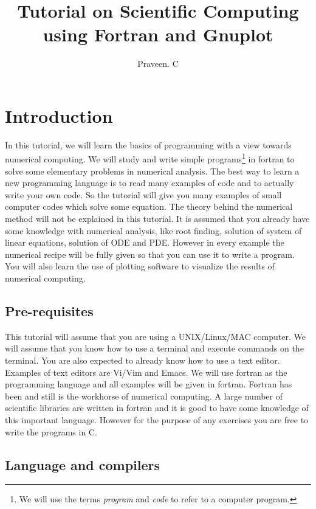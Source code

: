 \documentclass[11pt,oneside]{amsart}
\title{Tutorial on Scientific Computing \\using Fortran and Gnuplot}
\author{Praveen. C}
\date{}                                           %
\begin{document}
\maketitle

\lstset{basicstyle=\ttfamily,language=fortran, frame=single,showstringspaces=false,
numbers=left,numberstyle=\footnotesize}

\section{Introduction}
In this tutorial, we will learn the basics of programming with a view towards numerical computing. We will study and write simple programs\footnote{We will use the terms {\em program} and {\em code} to refer to a computer program.} in fortran to solve some elementary problems in numerical analysis. The best way to learn a new programming language is to read many examples of code and to actually write your own code. So the tutorial will give you many examples of small computer codes which solve some equation. The theory behind the numerical method will not be explained in this tutorial. It is assumed that you already have some knowledge with numerical analysis, like root finding, solution of system of linear equations, solution of ODE and PDE. However in every example the numerical recipe will be fully given so that you can use it to write a program. You will also learn the use of plotting software to visualize the results of  numerical computing. 

\subsection{Pre-requisites}

This tutorial will assume that you are using a UNIX/Linux/MAC computer. We will assume that you know how to use a terminal and execute commands on the terminal. You are also expected to already know how to use a text editor. Examples of text editors are Vi/Vim and Emacs. We will use fortran as the programming language and all examples will be given in fortran. Fortran has been and still is the workhorse of numerical computing. A large number of scientific libraries are written in fortran and it is good to have some knowledge of this important language. However for the purpose of any exercises you are free to write the programs in C.

\subsection{Language and compilers}
\end{document}

